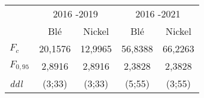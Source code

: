 \begin{tabular}{lcccc}
    \toprule
         & \multicolumn{2}{c}{2016 -2019} & \multicolumn{2}{c}{2016 -2021}  \\
         & Blé      & Nickel    & Blé       & Nickel                        \\
    \cmidrule(r){1-1}\cmidrule(lr){2-3}\cmidrule(l){4-5}
        $F_{c}$     & 20,1576   & 12,9965   & 56,8388   & 66,2263           \\
        $F_{0,95}$  & 2,8916    & 2,8916    & 2,3828    & 2,3828            \\*
        \textit{ddl}& (3;33)    & (3;33)    & (5;55)    & (3;55)            \\
    \bottomrule
\end{tabular}
